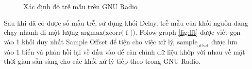 {\begin{figure}[!h]
\centering
{}
\hfill
{}
\hfill
\caption{Xác định độ trễ mẫu trên GNU Radio}
\end{figure}


Sau khi đã có được số mẫu trễ, sử dụng khối Delay, trễ mẫu của khối nguồn đang chạy nhanh đi một lượng $\textrm{argmax(xcorr( f ))}$.  Folow-graph \ref{fig:fft} được viết gọn vào 1 khối duy nhất Sample Offset để tiện cho việc xử lý, $\textrm{sample}_\textrm{offset}$ được lưu vào 1 biến và phản hồi lại về đầu vào để  căn chỉnh dữ liệu khớp với nhau về mặt thời gian sẵn sàng cho các  khối xử lý tiếp theo trong GNU Radio.

}

